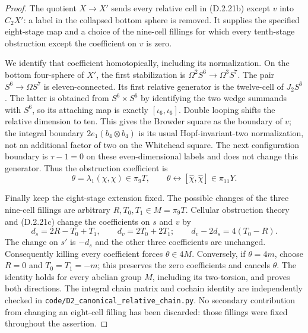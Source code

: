 \begin{proof}
The quotient $X\to X'$ sends every relative cell in
\textup{(D.2.21b)} except $v$ into $C_2X'$: a label in
the collapsed bottom sphere is removed. It supplies the
specified eight-stage map and a choice of the nine-cell
fillings for which every tenth-stage obstruction except
the coefficient on $v$ is zero.

We identify that coefficient homotopically, including its
normalization. On the bottom four-sphere of $X'$, the first
stabilization is $\Omega^2S^6\to\Omega^3S^7$.
The pair $S^6\to\Omega S^7$ is eleven-connected. Its first
relative generator is the twelve-cell of $J_2S^6$.
The latter is obtained from $S^6\times S^6$ by identifying
the two wedge summands with $S^6$, so its attaching map is
exactly $[\iota_6,\iota_6]$. Double looping shifts the
relative dimension to ten. This gives the Browder square
as the boundary of $v$; the integral boundary $2e_1(b_4
\otimes b_4)$ is its usual Hopf-invariant-two normalization,
not an additional factor of two on the Whitehead square.
The next configuration boundary is $\tau-1=0$ on these
even-dimensional labels and does not change this generator.
Thus the obstruction coefficient is
\[
 \theta=\lambda_1(\chi,\chi)\in\pi_9T,
 \qquad \theta\longleftrightarrow
 [\widehat\chi,\widehat\chi]\in\pi_{11}Y.
 \tag{D.2.21d}
\]

Finally keep the eight-stage extension fixed. The possible
changes of the three nine-cell fillings are arbitrary
$R,T_0,T_1\in M=\pi_9T$. Cellular obstruction theory and
\textup{(D.2.21c)} change the coefficients on $s$ and $v$ by
\[
 d_s=2R-T_0+T_1,\qquad d_v=2T_0+2T_1;
 \qquad d_v-2d_s=4(T_0-R).
 \tag{D.2.21e}
\]
The change on $s'$ is $-d_s$ and the other three coefficients
are unchanged. Consequently killing every coefficient
forces $\theta\in4M$. Conversely, if $\theta=4m$, choose
$R=0$ and $T_0=T_1=-m$; this preserves the zero
coefficients and cancels $\theta$. The identity holds for
every abelian group $M$, including its two-torsion, and
proves both directions. The integral chain matrix and
cochain identity are independently checked in
\texttt{code/D2\_canonical\_relative\_chain.py}.
No secondary contribution from changing an eight-cell
filling has been discarded: those fillings were fixed
throughout the assertion.
\end{proof}
